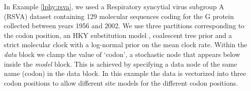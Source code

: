 \documentclass[10pt,letterpaper,table]{article}
\theoremstyle{definition}
\begin{document}
In Example \ref{lphy:rsva}, we used a Respiratory syncytial virus subgroup A (RSVA) dataset \cite{zlateva2004molecular, zlateva2005genetic} containing 129 molecular sequences coding for the G protein collected between years 1956 and 2002. 
We use three partitions corresponding to the codon position, an HKY substitution model \cite{hasegawa1985dating}, coalescent tree prior \cite{kingman82} and a strict molecular clock with a log-normal prior on the mean clock rate. 
Within the \textit{data} block we clamp the value of `codon', a stochastic node that appears below inside the \textit{model} block. 
This is achieved by specifying a data node of the same name (codon) in the data block. 
In this example the data is vectorized into three codon positions to allow different site models for the different codon positions.


\end{document}
